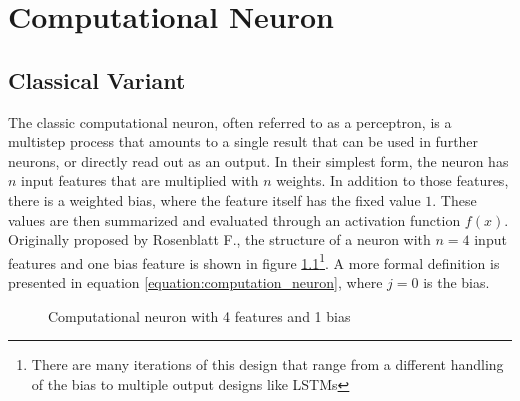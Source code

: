 \chapter{Computational Neuron} %

\label{chapter:computational_neuron} %


\newcommand{\keyword}[1]{\textbf{#1}}
\newcommand{\tabhead}[1]{\textbf{#1}}
\newcommand{\code}[1]{\texttt{#1}}
\newcommand{\file}[1]{\texttt{\bfseries#1}}
\newcommand{\option}[1]{\texttt{\itshape#1}}


\section{Classical Variant}
The classic computational neuron, often referred to as a perceptron, is a multistep process that amounts to a single result that can be used in further neurons, or directly read out as an output. In their simplest form, the neuron has $n$ input features that are multiplied with $n$ weights. In addition to those features, there is a weighted bias, where the feature itself has the fixed value $1$. These values are then summarized and evaluated through an activation function $f(x)$. Originally proposed by Rosenblatt F.\cite{rosenblatt_perceptron_1958}, the structure of a neuron with $n = 4$ input features and one bias feature is shown in figure \ref{figure:computation_neuron}\footnote{There are many iterations of this design that range from a different handling of the bias to multiple output designs like LSTMs\cite{lstm}}. A more formal definition is presented in equation \ref{equation:computation_neuron}, where $j=0$ is the bias.

\begin{figure}[h!]
    \centering
    \caption{Computational neuron with 4 features and 1 bias}
    \label{figure:computation_neuron}
\end{figure}


